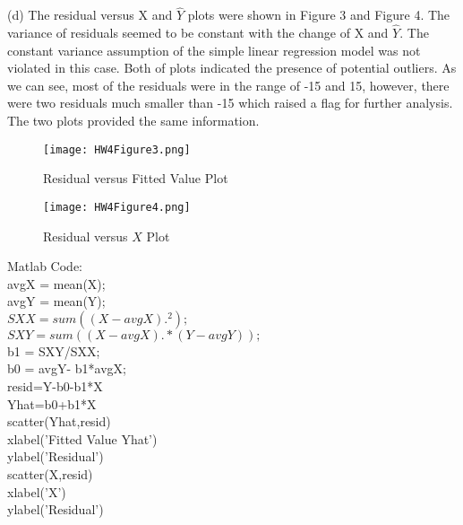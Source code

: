 \documentclass[12pt]{article}
\begin{document}
(d) The residual versus X and $\hat{Y}$ plots were shown in Figure 3 and Figure 4. The variance of residuals seemed to be constant with the change of X and $\hat{Y}$. The constant variance assumption of the simple linear regression model was not violated in this case. Both of plots indicated the presence of potential outliers. As we can see,  most of the residuals were in the range of -15 and 15, however, there were two residuals much smaller than -15 which raised a flag for further analysis. The two plots provided the same information.\\
\begin{figure}[h!]\centering
\graphicspath{{c:/users/qun/desktop/}}
\texttt{[image: HW4Figure3.png]}
\caption{Residual versus Fitted Value Plot}
\end{figure}
\begin{figure}[h!]
\centering
\graphicspath{{c:/users/qun/desktop/}}
\texttt{[image: HW4Figure4.png]}
\caption{Residual versus $X$ Plot}
\end{figure}
Matlab Code:\\
avgX = mean(X);\\
avgY = mean(Y);\\
$SXX = sum((X-avgX).^2);$\\
$SXY = sum((X-avgX).*(Y-avgY));$\\
b1 = SXY/SXX;\\
b0 = avgY- b1*avgX;\\
resid=Y-b0-b1*X\\
Yhat=b0+b1*X\\
scatter(Yhat,resid)\\
xlabel('Fitted Value Yhat')\\
ylabel('Residual')\\
scatter(X,resid)\\
xlabel('X')\\
ylabel('Residual')\\
\end{document}
